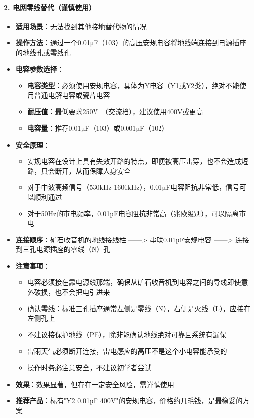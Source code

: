 \documentclass[12pt,UTF8]{ctexbook}
\begin{document}
\paragraph{2. 电网零线替代（谨慎使用）}
\begin{itemize}[leftmargin=3.5em]
    \item \textbf{适用场景}：无法找到其他接地替代物的情况
    \item \textbf{操作方法}：通过一个0.01μF（103）的高压安规电容将地线端连接到电源插座的地线孔或零线孔
    \item \textbf{电容参数选择}：
        \begin{itemize}[leftmargin=3.5em]
            \item \textbf{电容类型}：必须使用安规电容，具体为Y电容（Y1或Y2类），绝对不能使用普通电解电容或瓷片电容
            \item \textbf{耐压值}：最低要求250V~（交流档），建议使用400V或更高
            \item \textbf{电容量}：推荐0.01µF（103）或0.001µF（102）
        \end{itemize}
    \item \textbf{安全原理}：
        \begin{itemize}[leftmargin=3.5em]
            \item 安规电容在设计上具有失效开路的特点，即便被高压击穿，也不会造成短路，只会断开，从而保障人身安全
            \item 对于中波高频信号（530kHz-1600kHz），0.01µF电容阻抗非常低，信号可以顺利通过
            \item 对于50Hz的市电频率，0.01µF电容阻抗非常高（兆欧级别），可以隔离市电
        \end{itemize}
    \item \textbf{连接顺序}：矿石收音机的地线接线柱 ——> 串联0.01µF安规电容 ——> 连接到三孔电源插座的零线（N）孔
    \item \textbf{注意事项}：
        \begin{itemize}[leftmargin=3.5em]
            \item 电容必须接在靠电源线那端，确保从矿石收音机到电容之间的导线即使意外破损，也不会把电引进来
            \item 确认零线：标准三孔插座通常左侧是零线（N），右侧是火线（L），应接在左侧孔上
            \item 不建议接保护地线（PE），除非能确认地线绝对可靠且系统有漏保
            \item 雷雨天气必须断开连接，雷电感应的高压不是这个小电容能承受的
            \item 操作时务必注意安全，不建议初学者尝试
        \end{itemize}
    \item \textbf{效果}：效果显著，但存在一定安全风险，需谨慎使用
    \item \textbf{推荐产品}：标有"Y2 0.01µF 400V"的安规电容，价格约几毛钱，是最稳妥的方案
\end{itemize}
\end{document}
